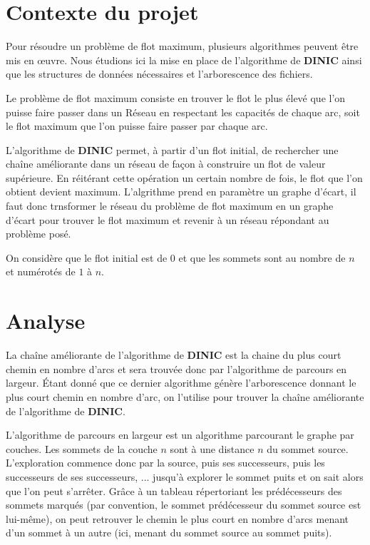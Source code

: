 \documentclass[11pt, a4paper]{report}
\begin{document}
	
	\tableofcontents
	
	
	\chapter{Contexte du projet}
	Pour résoudre un problème de flot maximum, plusieurs algorithmes peuvent être mis en œuvre. Nous étudions ici la mise en place de l'algorithme de \textbf{DINIC} ainsi que les structures de données nécessaires et l'arborescence des fichiers.
	
	Le problème de flot maximum consiste en trouver le flot le plus élevé que l'on puisse faire passer dans un Réseau en respectant les capacités de chaque arc, soit le flot maximum que l'on puisse faire passer par chaque arc.
	
	L'algorithme de \textbf{DINIC} permet, à partir d'un flot initial, de rechercher une chaîne améliorante dans un réseau de façon à construire un flot de valeur supérieure. En réitérant cette opération un certain nombre de fois, le flot que l'on obtient devient maximum. L'algrithme prend en paramètre un graphe d'écart, il faut donc trnsformer le réseau du problème de flot maximum en un graphe d'écart pour trouver le flot maximum et revenir à un réseau répondant au problème posé.
	
	On considère que le flot initial est de 0 et que les sommets sont au nombre de $n$ et numérotés de $1$ à $n$.
	
	
	
	\chapter{Analyse}
	La chaîne améliorante de l'algorithme de \textbf{DINIC} est la chaine du plus court chemin en nombre d'arcs et sera trouvée donc par l'algorithme de parcours en largeur. Étant donné que ce dernier algorithme génère l'arborescence donnant le plus court chemin en nombre d'arc, on l'utilise pour trouver la chaîne améliorante de l'algorithme de \textbf{DINIC}.
	
	L’algorithme de parcours en largeur est un algorithme parcourant le graphe par couches. Les sommets de la couche $n$ sont à une distance $n$ du sommet source. L’exploration commence donc par la source, puis ses successeurs, puis les successeurs de ses successeurs, ... jusqu’à explorer le sommet puits et on sait alors que l’on peut s’arrêter. Grâce à un tableau répertoriant les prédécesseurs des sommets marqués (par convention, le sommet prédécesseur du sommet source est lui-même), on peut retrouver le chemin le plus court en nombre d'arcs menant d’un sommet à un autre (ici, menant du sommet source au sommet puits).
	
\end{document}
